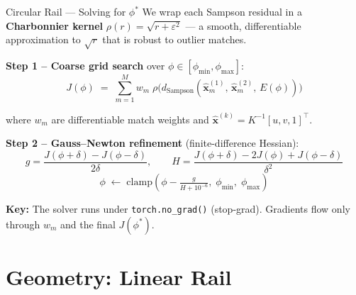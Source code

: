 \documentclass[aspectratio=169, 12pt]{beamer}
\begin{document}
\begin{frame}{Circular Rail --- Solving for $\phi^*$}
\small
We wrap each Sampson residual in a \textbf{Charbonnier kernel}
$\rho(r)=\sqrt{r+\varepsilon^{2}}$ --- a smooth, differentiable
approximation to $\sqrt{r}$ that is robust to outlier matches.

\smallskip
\textbf{Step 1 -- Coarse grid search} over $\phi\!\in\![\phi_{\min},\phi_{\max}]$:
\vspace{-0.5em}
\[
    J(\phi) \;=\; \sum_{m=1}^{M} w_m \;\rho\!\bigl(d_{\text{Sampson}}(\hat{\mathbf{x}}_m^{(1)},\,\hat{\mathbf{x}}_m^{(2)},\,E(\phi))\bigr)
\]
\vspace{-0.8em}

\noindent where $w_m$ are differentiable match weights and
$\hat{\mathbf{x}}^{(k)}\!=\!K^{-1}[u,v,1]^{\!\top}$.

\smallskip
\textbf{Step 2 -- Gauss--Newton refinement} (finite-difference Hessian):
\vspace{-0.5em}
\[
    g = \frac{J(\phi{+}\delta)-J(\phi{-}\delta)}{2\delta},\qquad
    H = \frac{J(\phi{+}\delta)-2J(\phi)+J(\phi{-}\delta)}{\delta^{2}}
\]
\vspace{-0.8em}
\[
    \phi \;\leftarrow\; \mathrm{clamp}\!\!\left(\phi - \tfrac{g}{H+10^{-6}},\;\phi_{\min},\;\phi_{\max}\right)
\]
\vspace{-0.5em}

\textbf{Key:} The solver runs under \texttt{torch.no\_grad()} (stop-grad).
Gradients flow only through $w_m$ and the final $J(\phi^{*})$.
\end{frame}

\section{Geometry: Linear Rail}
\end{document}
